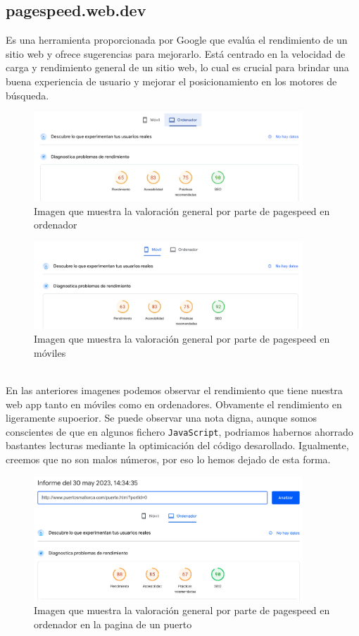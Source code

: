 \documentclass{article}
\begin{document}
\subsection{pagespeed.web.dev}
Es una herramienta proporcionada por Google que evalúa el rendimiento de un sitio web y ofrece sugerencias para mejorarlo. Está centrado en la velocidad de carga y rendimiento general de un sitio web, lo cual es crucial para brindar una buena experiencia de usuario y mejorar el posicionamiento en los motores de búsqueda.
\begin{figure}[ht]
    \centering
    \includegraphics[width=0.9\textwidth]{images/rendimiento.png}
    \caption{Imagen que muestra la valoración general por parte de pagespeed en ordenador}
\end{figure}
\begin{figure}[ht]
    \centering
    \includegraphics[width=0.9\textwidth]{images/rendimientoMobil.png}
    \caption{Imagen que muestra la valoración general por parte de pagespeed en móviles}
\end{figure}\\
En las anteriores imagenes podemos observar el rendimiento que tiene nuestra web app tanto en móviles como en ordenadores. Obvamente el rendimiento en ligeramente supoerior. Se puede observar una nota digna, aunque somos conscientes de que en algunos fichero \texttt{JavaScript}, podriamos habernos ahorrado bastantes lecturas mediante la optimicación del código desarollado. Igualmente, creemos que no son malos números, por eso lo hemos dejado de esta forma.
\newpage
\begin{figure}[ht]
    \centering
    \includegraphics[width=0.9\textwidth]{images/rendimentPort.png}
    \caption{Imagen que muestra la valoración general por parte de pagespeed en ordenador en la pagina de un puerto}
\end{figure}
\end{document}
